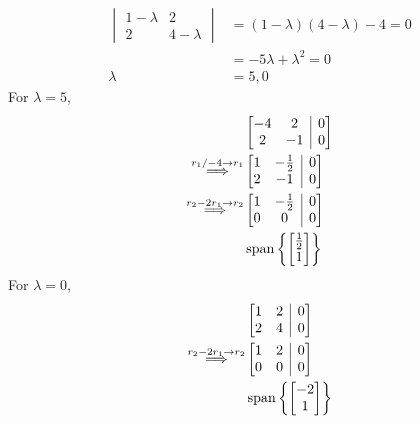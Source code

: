 \documentclass[]{article}
\numberwithin{equation}{section}
\newcommand{\Span}[1]{\operatorname{span}\left\lbrace{#1}\right\rbrace}
\begin{document}
\subsection{}

\begin{align}
	\begin{vmatrix}
	1 - \lambda & 2 \\
	2 & 4 - \lambda
	\end{vmatrix}
	&= (1-\lambda)(4 - \lambda) - 4 = 0 \\
	&= -5 \lambda + \lambda^2 = 0 \\
	\lambda &= 5,0
\end{align}
For \(\lambda = 5\), 
\begin{align}
	&\left[\begin{array}{@{}cc|c@{}}
	-4 & 2 & 0 \\
	2 & -1 & 0
	\end{array}\right] \\
	\overset{r_1/-4 \to r_1}{\Longrightarrow} &\left[\begin{array}{@{}cc|c@{}}
	1 & -\frac{1}{2} & 0 \\
	2 & -1 & 0
	\end{array}\right] \\
	\overset{r_2 - 2r_1 \to r_2}{\Longrightarrow} &\left[\begin{array}{@{}cc|c@{}}
	1 & -\frac{1}{2} & 0 \\
	0 & 0 & 0
	\end{array}\right] \\
	&\Span{\begin{bmatrix}
		\frac{1}{2} \\
		1
		\end{bmatrix}}
\end{align}
For \(\lambda = 0\),
\begin{align}
	&\left[\begin{array}{@{}cc|c@{}}
	1 & 2 & 0 \\
	2 & 4 & 0
	\end{array}\right] \\
	\overset{r_2 - 2r_1 \to r_2}{\Longrightarrow} &\left[\begin{array}{@{}cc|c@{}}
	1 & 2 & 0 \\
	0 & 0 & 0
	\end{array}\right] \\
	&\Span{\begin{bmatrix}
		-2 \\
		1
		\end{bmatrix}}
\end{align}
\end{document}
